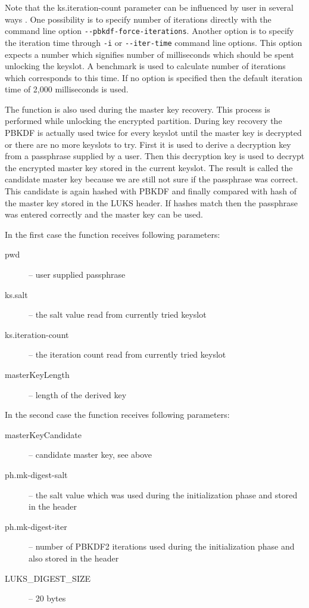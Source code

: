 \documentclass[nolof]{fithesis3}
\begin{document}
Note that the ks.iteration-count parameter can be influenced by user in several ways \parencite{cryptsetupmanual}. One possibility is to specify number of iterations directly with the command line option \verb+--pbkdf-force-iterations+. Another option is to specify the iteration time through \verb+-i+ or \verb+--iter-time+ command line options. This option expects a number which signifies number of milliseconds which should be spent unlocking the keyslot. A benchmark is used to calculate number of iterations which corresponds to this time. If no option is specified then the default iteration time of 2,000 milliseconds is used.

The function is also used during the master key recovery. This process is performed while unlocking the encrypted partition. During key recovery the PBKDF is actually used twice for every keyslot until the master key is decrypted or there are no more keyslots to try. First it is used to derive a decryption key from a passphrase supplied by a user. Then this decryption key is used to decrypt the encrypted master key stored in the current keyslot. The result is called the candidate master key because we are still not sure if the passphrase was correct. This candidate is again hashed with PBKDF and finally compared with hash of the master key stored in the LUKS header. If hashes match then the passphrase was entered correctly and the master key can be used.

In the first case the function receives following parameters:

\begin{description}
\item[pwd] -- user supplied passphrase

\item[ks.salt] -- the salt value read from currently tried keyslot

\item[ks.iteration-count] -- the iteration count read from currently tried keyslot

\item[masterKeyLength] -- length of the derived key
\end{description}

In the second case the function receives following parameters:

\begin{description}
\item[masterKeyCandidate] -- candidate master key, see above

\item[ph.mk-digest-salt] -- the salt value which was used during the initialization phase and stored in the header

\item[ph.mk-digest-iter] -- number of PBKDF2 iterations used during the initialization phase and also stored in the header

\item[LUKS\_DIGEST\_SIZE] -- 20 bytes
\end{description}
\end{document}
